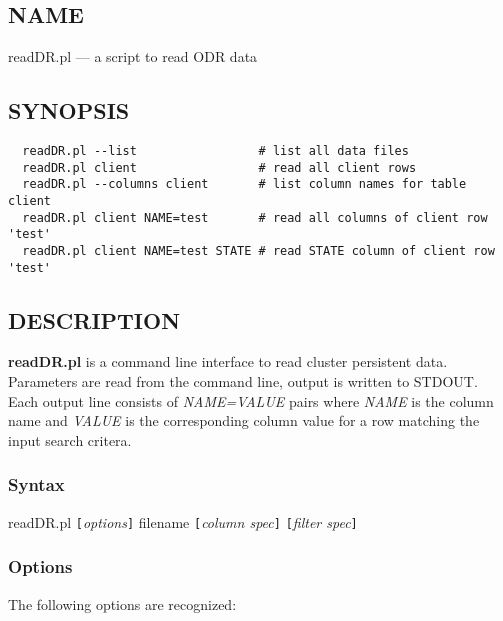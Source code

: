 \subsection*{NAME}
readDR.pl --- a script to read ODR data

\subsection*{SYNOPSIS}\begin{verbatim}
  readDR.pl --list                 # list all data files
  readDR.pl client                 # read all client rows
  readDR.pl --columns client       # list column names for table client
  readDR.pl client NAME=test       # read all columns of client row 'test'
  readDR.pl client NAME=test STATE # read STATE column of client row 'test'
\end{verbatim}

\subsection*{DESCRIPTION}
{\bf readDR.pl} is a command line interface to read cluster persistent data.
Parameters are read from the command line, output is written to STDOUT.
Each output line consists of {\em NAME=VALUE\/} pairs where {\em NAME\/} is the
column name and {\em VALUE\/} is the corresponding column value for a row
matching the input search critera.

\subsubsection*{Syntax}%

readDR.pl {\tt [}{\em options\/}{\tt ]} filename {\tt [}{\em column spec\/}{\tt ]} {\tt [}{\em filter spec\/}{\tt ]}

\subsubsection*{Options}%

The following options are recognized:

